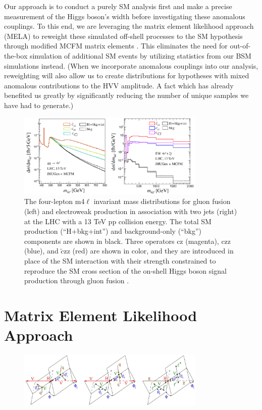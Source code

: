 Our approach is to conduct a purely SM analysis first and make a precise measurement of the Higgs boson's width before investigating these anomalous couplings. To this end, we are leveraging the matrix element likelihood approach (MELA) to reweight these simulated off-shell processes to the SM hypothesis through modified MCFM matrix elements \cite{12077235,10073492}. This eliminates the need for out-of-the-box simulation of additional SM events by utilizing statistics from our BSM simulations instead. (When we incorporate anomalous couplings into our analysis, reweighting will also allow us to create distributions for hypotheses with mixed anomalous contributions to the HVV amplitude. A fact which has already benefited us greatly by significantly reducing the number of unique samples we have had to generate.)

\begin{figure}
\centering
\includegraphics[width=0.8\textwidth,clip] {figures/offshellAC_BSI.png}
\caption{ The four-lepton m4$\ell$ invariant mass distributions for gluon fusion (left) and electroweak production in association with two jets (right) at the LHC with a 13 TeV pp collision energy. The total SM production (“H+bkg+int”) and background-only (“bkg”) components are shown in black. Three operators cz (magenta), czz (blue), and $\tilde{c}$zz (red) are shown
in color, and they are introduced in place of the SM interaction with their strength constrained
to reproduce the SM cross section of the on-shell Higgs boson signal production through gluon
fusion \cite{offshellWGnote}.}
\label{fig:offshellAC_BSI}
\end{figure}

\section{Matrix Element Likelihood Approach}

\begin{figure}
\centering
\includegraphics[width=0.8\textwidth,clip] {figures/MELA.jpg}
\caption{}
\label{fig:MELA}
\end{figure}

